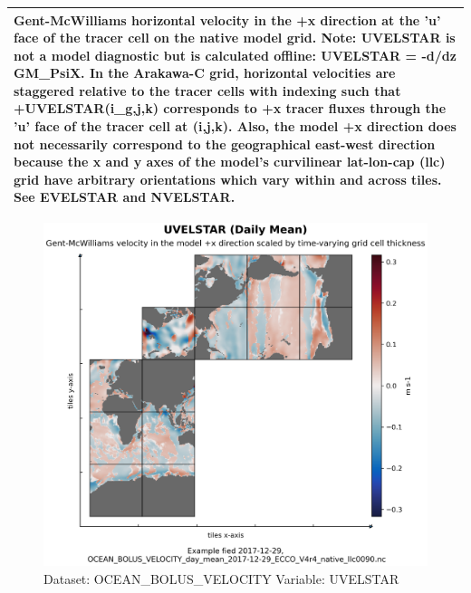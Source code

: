 \begin{longtable}{|m{}|m{}|m{}|m{}|}
\multicolumn{4}{|p{1\textwidth}|}{Gent-McWilliams horizontal velocity in the +x direction at the 'u' face of the tracer cell on the native model grid. Note: UVELSTAR is not a model diagnostic but is calculated offline: UVELSTAR = -d/dz GM\_PsiX. In the Arakawa-C grid, horizontal velocities are staggered relative to the tracer cells with indexing such that +UVELSTAR(i\_g,j,k) corresponds to +x tracer fluxes through the 'u' face of the tracer cell at (i,j,k). Also, the model +x direction does not necessarily correspond to the geographical east-west direction because the x and y axes of the model's curvilinear lat-lon-cap (llc) grid have arbitrary orientations which vary within and across tiles. See EVELSTAR and NVELSTAR.} \\ \hline
\end{longtable}

\begin{figure}[H]
\centering
\includegraphics[scale=0.55]{../images/plots/native_plots/Gent-McWilliams_Ocean_Bolus_Velocity/UVELSTAR.png}
\caption{Dataset: OCEAN\_BOLUS\_VELOCITY Variable: UVELSTAR}
\label{tab:table-OCEAN_BOLUS_VELOCITY_UVELSTAR-Plot}
\end{figure}
\pagebreak
